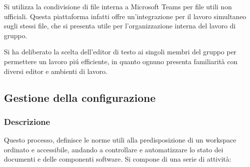         Si utilizza la condivisione di file interna a Microsoft Teams per file utili non ufficiali. Questa piattaforma infatti offre un'integrazione per il lavoro simultaneo sugli stessi file, che si presenta utile per l'organizzazione interna del lavoro di gruppo.

        Si ha deliberato la scelta dell'editor di testo ai singoli membri del gruppo per permettere un lavoro piú efficiente, in quanto ognuno presenta familiarità con diversi editor e ambienti di lavoro.

  \subsection{Gestione della configurazione}
    \subsubsection{Descrizione}
      Questo processo, definisce le norme utili alla predisposizione di un workspace ordinato e accessibile, andando a controllare e automatizzare lo stato dei documenti e delle componenti software. Si compone di una serie di attività:
